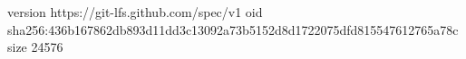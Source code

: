 version https://git-lfs.github.com/spec/v1
oid sha256:436b167862db893d11dd3c13092a73b5152d8d1722075dfd815547612765a78c
size 24576
